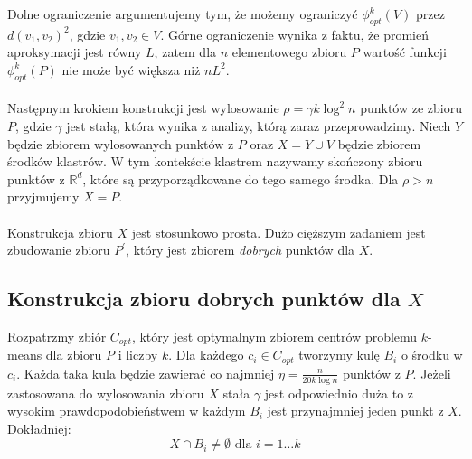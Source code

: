 Dolne ograniczenie argumentujemy tym, że możemy ograniczyć $\phi_{opt}^{k}(V)$ przez $d(v_{1}, v_{2})^2$, gdzie $v_{1}, v_{2} \in V$.
Górne ograniczenie wynika z faktu, że promień aproksymacji jest równy $L$, zatem dla $n$ elementowego zbioru $P$ wartość funkcji $\phi_{opt}^{k}(P)$ nie może być większa niż $nL^2$.
\\~\\
Następnym krokiem konstrukcji jest wylosowanie $\rho = \gamma k \log^{2} n$ punktów ze zbioru $P$, gdzie $\gamma$ jest stałą, która wynika z analizy, którą zaraz przeprowadzimy.
Niech $Y$ będzie zbiorem wylosowanych punktów z $P$ oraz $X = Y \cup V$ będzie zbiorem środków klastrów.
W tym kontekście klastrem nazywamy skończony zbioru punktów z $\mathbb{R}^{d}$, które są przyporządkowane do tego samego środka.
Dla $\rho > n$ przyjmujemy $X = P$.
\\~\\
Konstrukcja zbioru $X$ jest stosunkowo prosta.
Dużo cięższym zadaniem jest zbudowanie zbioru $P^{'}$, który jest zbiorem \textit{dobrych} punktów dla $X$.

\subsection{Konstrukcja zbioru dobrych punktów dla $X$}

Rozpatrzmy zbiór $C_{opt}$, który jest optymalnym zbiorem centrów problemu $k$-means dla zbioru $P$ i liczby $k$.
Dla każdego $c_{i} \in C_{opt}$ tworzymy kulę $B_{i}$ o środku w $c_{i}$.
Każda taka kula będzie zawierać co najmniej $\eta = \frac{n}{20k \log n}$ punktów z $P$.
Jeżeli zastosowana do wylosowania zbioru $X$ stała $\gamma$ jest odpowiednio duża to z wysokim prawdopodobieństwem w każdym $B_{i}$ jest przynajmniej jeden punkt z $X$.
Dokładniej:
\begin{equation}
    X \cap B_{i} \neq \emptyset \text{ dla } i = 1 \dots k
\end{equation}

